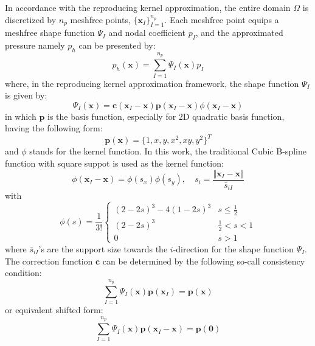 In accordance with the reproducing kernel approximation, the entire domain $\Omega$ is discretized by $n_p$ meshfree points, $\{\boldsymbol x_I\}_{I=1}^{n_p}$. Each meshfree point equips a meshfree shape function $\Psi_I$ and nodal coefficient $p_I$, and the approximated pressure namely $p_h$ can be presented by:
\begin{equation}
p_h(\boldsymbol x) = \sum_{I=1}^{n_p} \Psi_I(\boldsymbol x) p_I
\end{equation}
where, in the reproducing kernel approximation framework, the shape function $\Psi_I$ is given by:
\begin{equation}\label{rkshape}
\Psi_I(\boldsymbol x) = \boldsymbol c(\boldsymbol x_I-\boldsymbol x) \boldsymbol p(\boldsymbol x_I-\boldsymbol x) \phi(\boldsymbol x_I - \boldsymbol x)
\end{equation}
in which $\boldsymbol p$ is the basis function, especially for 2D quadratic basis function, having the following form: 
\begin{equation}
\boldsymbol p(\boldsymbol x) = \{ 1, x, y, x^2, xy, y^2\}^T
\end{equation}
and $\phi$ stands for the kernel function. In this work, the traditional Cubic B-spline function with square suppot is used as the kernel function:
\begin{equation}
\phi(\boldsymbol x_I-\boldsymbol x) = \phi(s_x) \phi(s_y), \quad s_i = \frac{\Vert \boldsymbol x_I - \boldsymbol x\Vert}{\bar s_{iI}}
\end{equation}
with
\begin{equation}
\phi(s) =\frac{1}{3!} \begin{cases}
    (2-2s)^3 - 4(1-2s)^3 & s\le\frac{1}{2} \\
    (2-2s)^3 &\frac{1}{2}<s<1 \\
    0 & s> 1
\end{cases}
\end{equation}
where $\bar s_{iI}$'s are the support size towards the $i$-direction for the shape function $\Psi_I$.
The correction function $\boldsymbol c$ can be determined by the following so-call consistency condition:
\begin{equation}\label{cc1}
\sum_{I=1}^{n_p}\Psi_I(\boldsymbol x) \boldsymbol p(\boldsymbol x_I) = \boldsymbol p (\boldsymbol x)
\end{equation}
or equivalent shifted form:
\begin{equation}\label{cc2}
\sum_{I=1}^{n_p}\Psi_I(\boldsymbol x) \boldsymbol p(\boldsymbol x_I-\boldsymbol x) = \boldsymbol p (\boldsymbol 0)
\end{equation}

